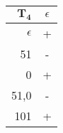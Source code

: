 \begingroup
\scriptsize
\begin{tabular}{r | c}
    $\mathbf{T_4}$ & $\epsilon$ \\ \hline
    $\epsilon$ & + \\
    51 & - \\ \hline
    0 & + \\
    51,0 & - \\
    101 & +
\end{tabular}
\endgroup
